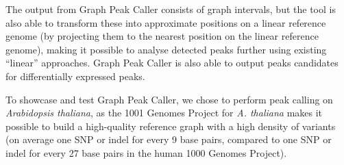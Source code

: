 \documentclass[10pt,letterpaper]{article}
\begin{document}
The output from Graph Peak Caller consists of graph intervals, but the tool is also able to transform these into approximate positions on a linear reference genome (by projecting them to the nearest position on the linear reference genome), making it possible to analyse detected peaks further using existing “linear” approaches.
Graph Peak Caller is also able to output peaks candidates for differentially expressed peaks.

To showcase and test Graph Peak Caller, we chose to perform peak calling on \emph{Arabidopsis thaliana}, as the 1001 Genomes Project for \emph{A. thaliana} makes it possible to build a high-quality reference graph with a high density of variants (on average one SNP or indel for every 9 base pairs, compared to one SNP or indel for every 27 base pairs in the human 1000 Genomes Project). 
\end{document}
